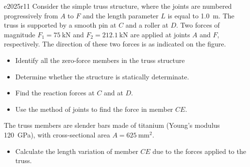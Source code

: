 
\begin{problemwithimage}{e2025r1}{1}
  Consider the simple truss structure, where the joints are numbered progressively from $A$ to $F$ and the length parameter $L$ is equal to \qty{1,0}{\m}.
  The truss is supported by a smooth pin at $C$ and a roller at $D$.
  Two forces of magnitude $F_1 = \qty{75}{\kN}$ and $F_2 = \qty{212,1}{\kN}$ are applied at joints $A$ and $F$, respectively.
  The direction of these two forces is as indicated on the figure.

  \begin{itemize}
    \item[Q1.1] Identify all the zero-force members in the truss structure
    \item[Q1.2] Determine whether the structure is statically determinate.
    \item[Q1.3] Find the reaction forces at $C$ and at $D$.
    \item[Q1.4] Use the method of joints to find the force in member $CE$.
  \end{itemize}

  The truss members are slender bars made of titanium (Young's modulus \qty{120}{\GPa}), with cross-sectional area $A = \qty{625}{\mm^2}$.

  \begin{itemize}
    \item[Q1.5] Calculate the length variation of member $CE$ due to the forces applied to the truss.
  \end{itemize}
\end{problemwithimage}

